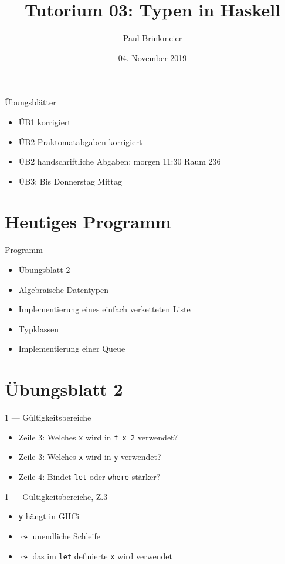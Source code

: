 \documentclass{beamer}
\title{Tutorium 03: Typen in Haskell}
\author{Paul Brinkmeier}
\institute{Tutorium Programmierparadigmen am KIT}
\date{04. November 2019}
\newcommand{\code}[1]{
	\begin{mdframed}
		
	\end{mdframed}
}
\begin{document}
\begin{frame}
	\titlepage
\end{frame}

\begin{frame}{Übungsblätter}
	\begin{itemize}
		\item ÜB1 korrigiert
		\item ÜB2 Praktomatabgaben korrigiert
		\item ÜB2 handschriftliche Abgaben: morgen 11:30 Raum 236
		\item ÜB3: Bis Donnerstag Mittag
	\end{itemize}
\end{frame}

\section{Heutiges Programm}
\begin{frame}{Programm}
	\begin{itemize}
		\item Übungsblatt 2
		\item Algebraische Datentypen
		\item Implementierung eines einfach verketteten Liste
		\item Typklassen
		\item Implementierung einer Queue
	\end{itemize}
\end{frame}

\section{Übungsblatt 2}

\begin{frame}{1 --- Gültigkeitsbereiche}
	\code{demos/Binding.hs}

	\begin{itemize}
		\item Zeile 3: Welches \texttt{x} wird in \texttt{f x 2} verwendet?
		\item Zeile 3: Welches \texttt{x} wird in \texttt{y} verwendet?
		\item Zeile 4: Bindet \texttt{let} oder \texttt{where} stärker?
	\end{itemize}
\end{frame}

\begin{frame}{1 --- Gültigkeitsbereiche, Z.3}
	\code{demos/LetXInFx.hs}
	\pause
	\begin{itemize}
		\item \texttt{y} hängt in GHCi
		\item $\leadsto$ unendliche Schleife
		\item $\leadsto$ das im \texttt{let} definierte \texttt{x} wird verwendet
	\end{itemize}
\end{frame}
\end{document}
